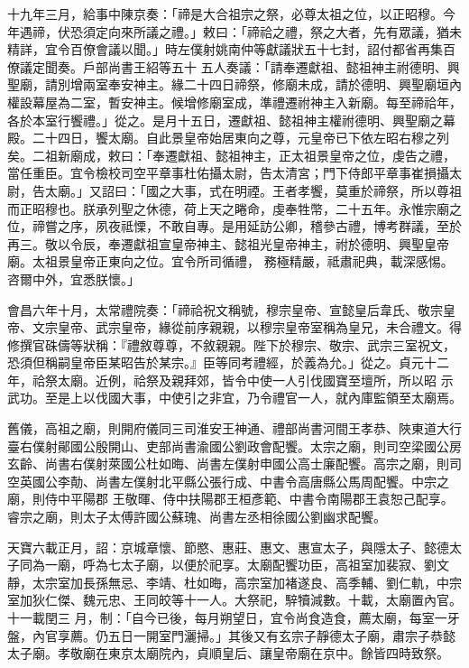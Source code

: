 \begin{pinyinscope}
 十九年三月，給事中陳京奏：「禘是大合祖宗之祭，必尊太祖之位，以正昭穆。今年遇禘，伏恐須定向來所議之禮。」敕曰：「禘祫之禮，祭之大者，先有眾議，猶未精詳，宜令百僚會議以聞。」時左僕射姚南仲等獻議狀五十七封，詔付都省再集百僚議定聞奏。戶部尚書王紹等五十
 五人奏議：「請奉遷獻祖、懿祖神主祔德明、興聖廟，請別增兩室奉安神主。緣二十四日禘祭，修廟未成，請於德明、興聖廟垣內權設幕屋為二室，暫安神主。候增修廟室成，準禮遷祔神主入新廟。每至禘祫年，各於本室行饗禮。」從之。是月十五日，遷獻祖、懿祖神主權祔德明、興聖廟之幕殿。二十四日，饗太廟。自此景皇帝始居東向之尊，元皇帝已下依左昭右穆之列矣。二祖新廟成，敕曰：「奉遷獻祖、懿祖神主，正太祖景皇帝之位，虔告之禮，
 當任重臣。宜令檢校司空平章事杜佑攝太尉，告太清宮；門下侍郎平章事崔損攝太尉，告太廟。」又詔曰：「國之大事，式在明禋。王者孝饗，莫重於禘祭，所以尊祖而正昭穆也。朕承列聖之休德，荷上天之睠命，虔奉牲幣，二十五年。永惟宗廟之位，禘嘗之序，夙夜祗慄，不敢自專。是用延訪公卿，稽參古禮，博考群議，至於再三。敬以令辰，奉遷獻祖宣皇帝神主、懿祖光皇帝神主，祔於德明、興聖皇帝廟。太祖景皇帝正東向之位。宜令所司循禮，
 務極精嚴，祗肅祀典，載深感惕。咨爾中外，宜悉朕懷。」



 會昌六年十月，太常禮院奏：「禘祫祝文稱號，穆宗皇帝、宣懿皇后韋氏、敬宗皇帝、文宗皇帝、武宗皇帝，緣從前序親親，以穆宗皇帝室稱為皇兄，未合禮文。得修撰官硃儔等狀稱：『禮敘尊尊，不敘親親。陛下於穆宗、敬宗、武宗三室祝文，恐須但稱嗣皇帝臣某昭告於某宗。』臣等同考禮經，於義為允。」從之。貞元十二年，祫祭太廟。近例，祫祭及親拜郊，皆令中使一人引伐國寶至壇所，所以昭
 示武功。至是上以伐國大事，中使引之非宜，乃令禮官一人，就內庫監領至太廟焉。



 舊儀，高祖之廟，則開府儀同三司淮安王神通、禮部尚書河間王孝恭、陜東道大行臺右僕射鄖國公殷開山、吏部尚書渝國公劉政會配饗。太宗之廟，則司空梁國公房玄齡、尚書右僕射萊國公杜如晦、尚書左僕射申國公高士廉配饗。高宗之廟，則司空英國公李勣、尚書左僕射北平縣公張行成、中書令高唐縣公馬周配饗。中宗之廟，則侍中平陽郡
 王敬暉、侍中扶陽郡王桓彥範、中書令南陽郡王袁恕己配享。睿宗之廟，則太子太傅許國公蘇瑰、尚書左丞相徐國公劉幽求配饗。



 天寶六載正月，詔：京城章懷、節愍、惠莊、惠文、惠宣太子，與隱太子、懿德太子同為一廟，呼為七太子廟，以便於祀享。太廟配饗功臣，高祖室加裴寂、劉文靜，太宗室加長孫無忌、李靖、杜如晦，高宗室加褚遂良、高季輔、劉仁軌，中宗室加狄仁傑、魏元忠、王同皎等十一人。大祭祀，騂犢減數。十載，太廟置內官。十一載閏三
 月，制：「自今已後，每月朔望日，宜令尚食造食，薦太廟，每室一牙盤，內官享薦。仍五日一開室門灑掃。」其後又有玄宗子靜德太子廟，肅宗子恭懿太子廟。孝敬廟在東京太廟院內，貞順皇后、讓皇帝廟在京中。餘皆四時致祭。



\end{pinyinscope}